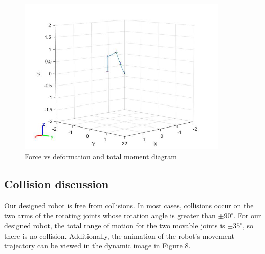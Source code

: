 \begin{figure}[htbp]
    \centering
    \includegraphics[width=10cm]{./fig/1.jpg}
    \caption{Force vs deformation and total moment diagram}
    \label{f4}
\end{figure}

\subsection{Collision discussion}

Our designed robot is free from collisions. In most cases, collisions occur on the two arms of the rotating joints whose rotation angle is greater than $±90^\circ$. For our designed robot, the total range of motion for the two movable joints is $±35^\circ$, so there is no collision. Additionally, the animation of the robot's movement trajectory can be viewed in the dynamic image in Figure 8.
